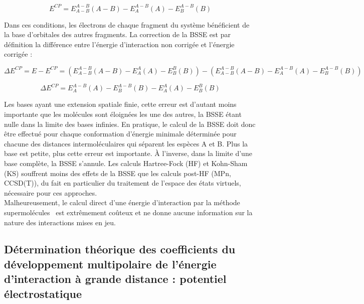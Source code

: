 	\begin{equation}
	E^{CP} = E_{A-B}^{A-B}(A-B) - E_{A}^{A-B}(A) - E_{B}^{A-B}(B)
	\end{equation}
	
	Dans ces conditions, les électrons de chaque fragment du système bénéficient de la base d'orbitales des autres fragments. La correction de la BSSE est par définition la différence entre l'énergie d'interaction non corrigée et l'énergie corrigée :
	
	\begin{equation}
	\Delta E^{CP} = E - E^{CP} = (E_{A-B}^{A-B}(A-B) - E_{A}^{A}(A) - E_{B}^{B}(B)) - (E_{A-B}^{A-B}(A-B) - E_{A}^{A-B}(A) - E_{B}^{A-B}(B))
	\end{equation}
	
	\begin{equation}
	\Delta E^{CP} =  E_{A}^{A-B}(A) - E_{B}^{A-B}(B) - E_{A}^{A}(A) - E_{B}^{B}(B)
	\end{equation}
	
	Les bases ayant une extension spatiale finie, cette erreur est d'autant moins importante que les molécules sont éloignées les une des autres, la BSSE étant nulle dans la limite des bases infinies. En pratique, le calcul de la BSSE doit donc être effectué pour chaque conformation d’énergie minimale déterminée pour chacune des distances intermoléculaires qui séparent les espèces A et B. Plus la base est petite, plus cette erreur est importante. À l'inverse, dans la limite d’une base complète, la BSSE s’annule.
	Les calculs Hartree-Fock (HF) et Kohn-Sham (KS) souffrent moins des effets de la BSSE \cite{garza2005role} que les calculs post-HF (MPn, CCSD(T)), du fait en particulier du traitement de l’espace des états virtuels, nécessaire pour ces approches.\\
	
	
	Malheureusement, le calcul direct d’une énergie d’interaction par la méthode \og supermolécules \fg{} est extrêmement coûteux et ne donne aucune information sur la nature des interactions mises en jeu.\\
	
	\subsection{Détermination théorique des coefficients du développement multipolaire de l’énergie d'interaction à grande distance : potentiel électrostatique}
	
